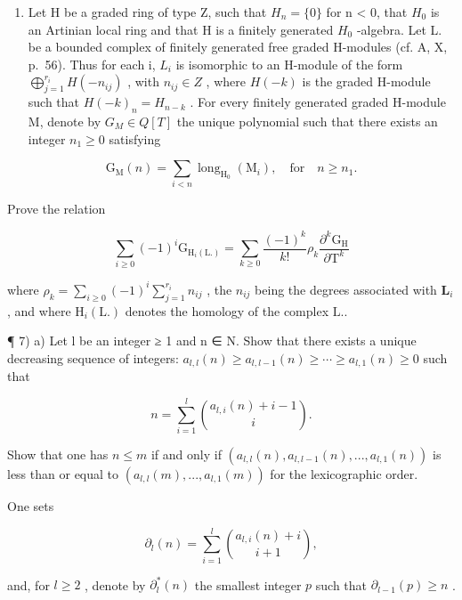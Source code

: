 \begin{enumerate}
\def\labelenumi{\arabic{enumi})}
\setcounter{enumi}{5}
\tightlist
\item
  Let H be a graded ring of type Z, such that \(H_{n} = \{0\}\) for n \textless{} 0, that \(H_{0}\) is an Artinian local ring and that H is a finitely generated \(H_{0}\) -algebra. Let L. be a bounded complex of finitely generated free graded H-modules (cf. A, X, p.~56). Thus for each i, \(L_{i}\) is isomorphic to an H-module of the form \(\bigoplus_{j=1}^{r_{i}} H(-n_{ij})\) , with \(n_{ij} \in Z\) , where \(H(-k)\) is the graded H-module such that \(H(-k)_{n} = H_{n-k}\) . For every finitely generated graded H-module M, denote by \(G_{M} \in Q[T]\) the unique polynomial such that there exists an integer \(n_{1} \geqslant 0\) satisfying
\end{enumerate}

\[
\mathrm{G} _ {\mathrm{M}} (n) = \sum_ {i <   n} \operatorname{long} _ {\mathrm{H} _ {0}} (\mathrm{M} _ {i}), \quad \text {for} \quad n \geqslant n _ {1}.
\]

Prove the relation

\[
\sum_ {i \geqslant 0} (- 1) ^ {i} \mathrm{G} _ {\mathrm{H} _ {i} (\mathrm{L.})} = \sum_ {k \geqslant 0} \frac {(- 1) ^ {k}}{k !} \rho_ {k} \frac {\partial^ {k} \mathrm{G} _ {\mathrm{H}}}{\partial \mathrm{T} ^ {k}}
\]

where \(\rho_{k} = \sum_{i\geqslant 0}(-1)^{i}\sum_{j = 1}^{r_{i}}n_{ij}\) , the \(n_{ij}\) being the degrees associated with \(\mathbf{L}_i\) , and where \(\mathrm{H}_i(\mathrm{L.})\) denotes the homology of the complex \(\mathrm{L.}\).

¶ 7) a) Let l be an integer ≥ 1 and n ∈ N. Show that there exists a unique decreasing sequence of integers: \(a_{l,l}(n) \geqslant a_{l,l-1}(n) \geqslant \cdots \geqslant a_{l,1}(n) \geqslant 0\) such that

\[
n = \sum_ {i = 1} ^ {l} \binom {a _ {l, i} (n) + i - 1} {i}.
\]

Show that one has \(n \leqslant m\) if and only if \((a_{l,l}(n), a_{l,l-1}(n), ..., a_{l,1}(n))\) is less than or equal to \((a_{l,l}(m), ..., a_{l,1}(m))\) for the lexicographic order.

One sets

\[
\partial_ {l} (n) = \sum_ {i = 1} ^ {l} \binom {a _ {l, i} (n) + i} {i + 1},
\]

and, for \(l \geqslant 2\) , denote by \(\partial_l^*(n)\) the smallest integer \(p\) such that \(\partial_{l-1}(p) \geqslant n\) .


